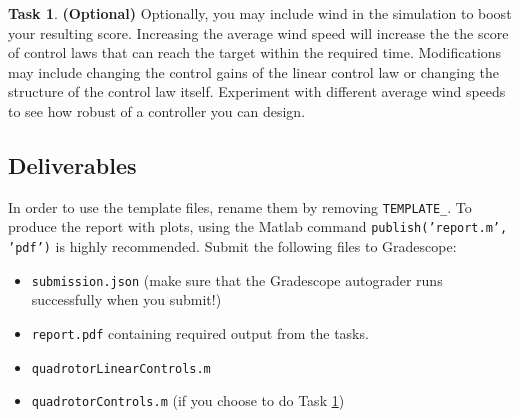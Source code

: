 \documentclass{article}
\theoremstyle{definition}
\newtheorem{task}{Task}
\begin{document}
\begin{task} \textbf{(Optional)} \label{task:wind}
    Optionally, you may include wind in the simulation to boost your resulting score. Increasing the average wind speed will increase the the score of control laws that can reach the target within the required time. Modifications may include changing the control gains of the linear control law or changing the structure of the control law itself. Experiment with different average wind speeds to see how robust of a controller you can design.
\end{task}


\subsection*{Deliverables}
In order to use the template files, rename them by removing \texttt{TEMPLATE\_}. To produce the report with plots, using the Matlab command \texttt{publish('report.m', 'pdf')} is highly recommended. Submit the following files to Gradescope:
\begin{itemize}[noitemsep]
    \item \texttt{submission.json} (make sure that the Gradescope autograder runs successfully when you submit!)
    \item \texttt{report.pdf} containing required output from the tasks.
    \item \texttt{quadrotorLinearControls.m}
    \item \texttt{quadrotorControls.m} (if you choose to do Task \ref{task:wind})
\end{itemize}
\end{document}
